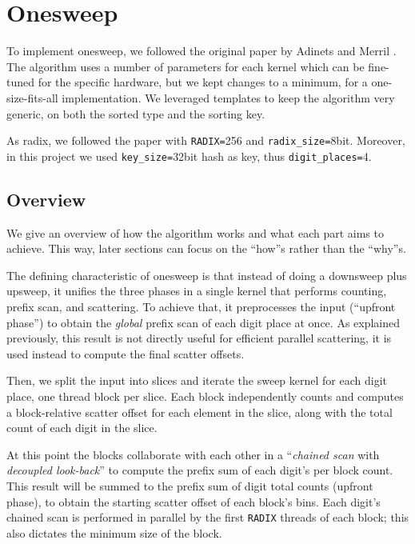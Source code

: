\documentclass[a4paper]{report}
\newcommand{\ones}{onesweep\xspace}
\begin{document}
\section{Onesweep}

To implement \ones, we followed the original paper by Adinets and Merril \cite{adinets2022onesweep}. The algorithm uses a number of parameters for each kernel which can be fine-tuned for the specific hardware, but we kept changes to a minimum, for a one-size-fits-all implementation. We leveraged templates to keep the algorithm very generic, on both the sorted type and the sorting key.

As radix, we followed the paper with \lstinline{RADIX=}256 and \lstinline{radix_size=}8bit. Moreover, in this project we used \lstinline{key_size=}32bit hash as key, thus \lstinline{digit_places=}4.

\subsection{Overview}

We give an overview of how the algorithm works and what each part aims to achieve. This way, later sections can focus on the ``how''s rather than the ``why''s.

The defining characteristic of \ones is that instead of doing a downsweep plus upsweep, it unifies the three phases in a single kernel that performs counting, prefix scan, and scattering. To achieve that, it preprocesses the input (``upfront phase'') to obtain the \emph{global} prefix scan of each digit place at once. As explained previously, this result is not directly useful for efficient parallel scattering, it is used instead to compute the final scatter offsets.

Then, we split the input into slices and iterate the sweep kernel for each digit place, one thread block per slice. Each block independently counts and computes a block-relative scatter offset for each element in the slice, along with the total count of each digit in the slice.

At this point the blocks collaborate with each other in a ``\emph{chained scan} with \emph{decoupled look-back}'' to compute the prefix sum of each digit's per block count. This result will be summed to the prefix sum of digit total counts (upfront phase), to obtain the starting scatter offset of each block's bins. Each digit's chained scan is performed in parallel by the first \lstinline{RADIX} threads of each block; this also dictates the minimum size of the block.
\end{document}

